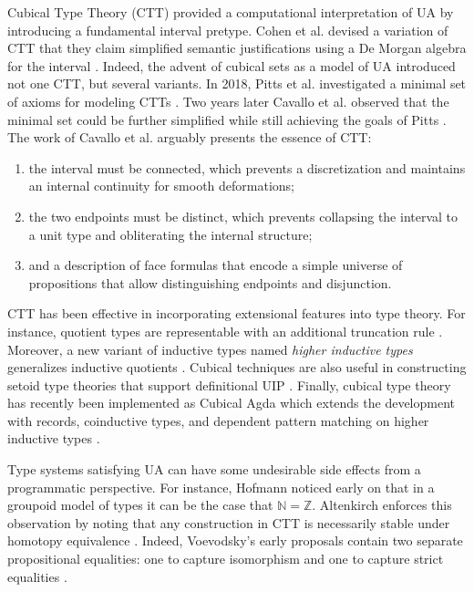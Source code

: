 Cubical Type Theory (CTT) provided a computational interpretation of UA by introducing a fundamental interval pretype.
Cohen et al. devised a variation of CTT that they claim simplified semantic justifications using a De Morgan algebra for the interval \cite{cohen2016}.
Indeed, the advent of cubical sets as a model of UA introduced not one CTT, but several variants.
In 2018, Pitts et al. investigated a minimal set of axioms for modeling CTTs \cite{pitts2018}.
Two years later Cavallo et al. observed that the minimal set could be further simplified while still achieving the goals of Pitts \cite{cavallo2020}.
The work of Cavallo et al. arguably presents the essence of CTT:
\begin{enumerate}
    \item {
        the interval must be connected, which prevents a discretization and maintains an internal continuity for smooth deformations;
    }
    \item {
        the two endpoints must be distinct, which prevents collapsing the interval to a unit type and obliterating the internal structure;
    }
    \item {
        and a description of face formulas that encode a simple universe of propositions that allow distinguishing endpoints and disjunction.
    }
\end{enumerate}
CTT has been effective in incorporating extensional features into type theory.
For instance, quotient types are representable with an additional truncation rule \cite{kraus2020}.
Moreover, a new variant of inductive types named \textit{higher inductive types} generalizes inductive quotients \cite{angiuli2017}.
Cubical techniques are also useful in constructing setoid type theories that support definitional UIP \cite{sterling2020}.
Finally, cubical type theory has recently been implemented as Cubical Agda which extends the development with records, coinductive types, and dependent pattern matching on higher inductive types \cite{vezzosi2021}.

Type systems satisfying UA can have some undesirable side effects from a programmatic perspective.
For instance, Hofmann noticed early on that in a groupoid model of types it can be the case that $\mathbb{N} = \mathbb{Z}$.
Altenkirch enforces this observation by noting that any construction in CTT is necessarily stable under homotopy equivalence \cite{altenkirch2016}.
Indeed, Voevodsky's early proposals contain two separate propositional equalities: one to capture isomorphism and one to capture strict equalities \cite{voevodsky2013}.

